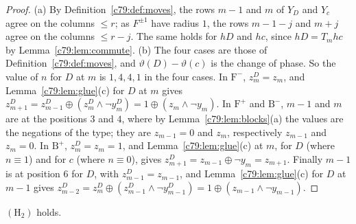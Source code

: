 \begin{proof}
(a) By Definition~\ref{c79:def:moves}, the rows $m-1$ and $m$ of $Y_D$ and $Y_c$ agree on the columns $\le r$; as $F^{\pm1}$ have radius $1$, the rows $m-1-j$ and $m+j$ agree on the columns $\le r-j$. The same holds for $hD$ and $hc$, since $hD=T_mhc$ by Lemma~\ref{c79:lem:commute}. (b) The four cases are those of Definition~\ref{c79:def:moves}, and $\vartheta(D)-\vartheta(c)$ is the change of phase. So the value of $n$ for $D$ at $m$ is $1,4,4,1$ in the four cases. In $\mathrm F^-$, $z^D_m=z_m$, and Lemma~\ref{c79:lem:glue}(c) for $D$ at $m$ gives $z^D_{m+1}=z^D_{m-1}\oplus(z^D_m\wedge\neg y^D_m)=1\oplus(z_m\wedge\neg y_m)$. In $\mathrm F^+$ and $\mathrm B^-$, $m-1$ and $m$ are at the positions $3$ and $4$, where by Lemma~\ref{c79:lem:blocks}(a) the values are the negations of the type; they are $z_{m-1}=0$ and $z_m$, respectively $z_{m-1}$ and $z_m=0$. In $\mathrm B^+$, $z^D_m=z_m=1$, and Lemma~\ref{c79:lem:glue}(c) at $m$, for $D$ (where $n\equiv1$) and for $c$ (where $n\equiv0$), gives $z^D_{m+1}=z_{m-1}\oplus\neg y_m=z_{m+1}$. Finally $m-1$ is at position $6$ for $D$, with $z^D_{m-1}=z_{m-1}$, and Lemma~\ref{c79:lem:glue}(c) for $D$ at $m-1$ gives $z^D_{m-2}=z^D_m\oplus(z^D_{m-1}\wedge\neg y^D_{m-1})=1\oplus(z_{m-1}\wedge\neg y_{m-1})$.
\end{proof}

\begin{proposition}[$(\mathrm H_2)$]\label{c79:prop:H2}
$(\mathrm H_2)$ holds.
\end{proposition}

